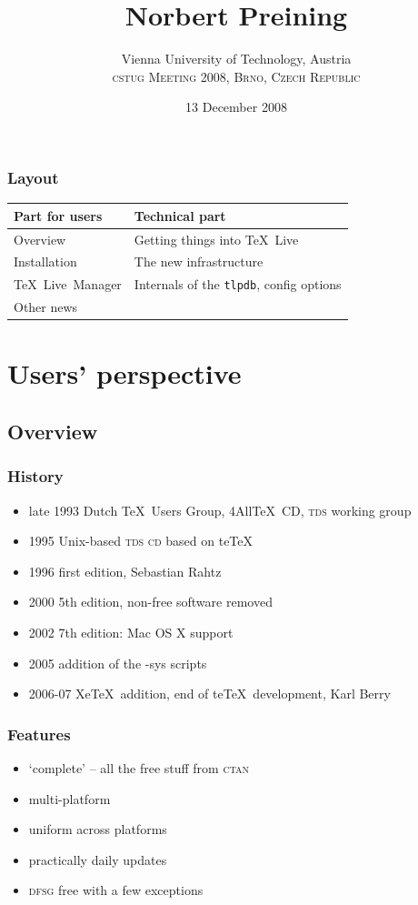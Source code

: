\documentclass{beamer}
\title{} %
\title{Norbert Preining}
\author{Vienna University of Technology, Austria\\[\bigskipamount]
\textsc{cstug Meeting 2008, Brno, Czech Republic}}
\date{13 December 2008}
\newcommand{\tl}{\TeX~Live}
\newcommand{\tlpdb}{\texttt{tlpdb}}
\newcommand{\tlmgr}{\tl~Manager}
\newcommand{\acro}[1]{\textsc{\MakeLowercase{#1}}}
\def\bigit{\\[\bigskipamount]}
\def\cblue#1{{\usebeamercolor[fg]{structure}#1}}
\def\img#1#2#3#4{%
  \bgroup%
  \setbox0=\hbox{\hskip #3\vbox to 0pt{\vskip #4 \texttt{[image: \#1]}}}%
  \dp0=0pt %
  \ht0=0pt %
  \wd0=0pt %
  \hbox{\box0}
  \egroup}
\begin{document}
\frame{\titlepage}

\begin{frame}
  \frametitle{Layout}
  \begin{center}
    \begin{tabular}[h!]{ll}
      \cblue{Part for users} & \cblue{Technical part} \\
      \midrule
      Overview  & Getting things into \tl \\
      Installation & The new infrastructure \\
      \tlmgr \qquad\qquad & Internals of the \tlpdb, config options\\
      Other news
    \end{tabular}
  \end{center}
\end{frame}

\section{Users' perspective}

\subsection{Overview}

\begin{frame}
  \frametitle{History}
  \begin{itemize}
  \item late 1993 Dutch \TeX\ Users Group, 4All\TeX\ CD, \acro{tds}
    working group\pause
  \item 1995 Unix-based \acro{TDS} \acro{CD} based on te\TeX\pause
  \item 1996 first edition, Sebastian Rahtz%
    \uncover<3-3>{\img{rahtz.png}{110pt}{10pt}{-5pt}}\pause
  \item 2000 5th edition, non-free software removed\pause
  \item 2002 7th edition: Mac OS X support\pause
  \item 2005 addition of the -sys scripts\pause
  \item 2006-07 Xe\TeX\ addition, end of te\TeX\ development, Karl Berry
    \uncover<7-7>{\img{berry.jpg}{100pt}{150pt}{-130pt}}
  \end{itemize}
\end{frame}

\begin{frame}
  \frametitle{Features}

  \begin{itemize}
  \item `complete' -- all the free stuff from \textsc{ctan}\bigit
  \item multi-platform\bigit
  \item uniform across platforms\bigit
  \item practically daily updates\bigit
  \item \textsc{dfsg} free with a few exceptions
  \end{itemize}
\end{frame}
\end{document}
